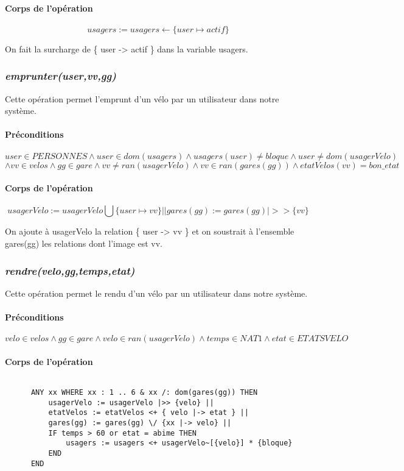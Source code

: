 \documentclass[12pt]{article}
\begin{document}
\paragraph{Corps de l'opération}
\[usagers := usagers \leftarrow \{user \mapsto actif\} \]

On fait la surcharge de \{ user -> actif \} dans la variable usagers.
\subsubsection{\textit{emprunter(user,vv,gg)}}
Cette opération permet l'emprunt d'un vélo par un utilisateur dans notre système.
\paragraph{Préconditions}
\[ user \in PERSONNES \land user \in dom(usagers) \land usagers(user) \neq bloque \land user \neq dom(usagerVelo) \]\[\land vv \in velos \land gg \in gare \land vv \neq ran(usagerVelo) \land vv \in ran(gares(gg)) \land etatVelos(vv) = bon\_etat\]
\paragraph{Corps de l'opération}
	\[ usagerVelo := usagerVelo \bigcup \{user \mapsto vv\} ||
gares(gg) := gares(gg) |>> \{vv\}\]

On ajoute à usagerVelo la relation \{ user -> vv \} et on soustrait à l'ensemble gares(gg) les relations dont l'image est vv.
\subsubsection{\textit{rendre(velo,gg,temps,etat)}}
Cette opération permet le rendu d'un vélo par un utilisateur dans notre système.
\paragraph{Préconditions}
\[ velo \in velos \land gg \in gare \land velo \in ran(usagerVelo) \land temps \in NAT1 \land etat \in ETATSVELO\]

\paragraph{Corps de l'opération}
\[\]
\begin{lstlisting}
      ANY xx WHERE xx : 1 .. 6 & xx /: dom(gares(gg)) THEN
          usagerVelo := usagerVelo |>> {velo} ||
          etatVelos := etatVelos <+ { velo |-> etat } ||
          gares(gg) := gares(gg) \/ {xx |-> velo} ||
          IF temps > 60 or etat = abime THEN
              usagers := usagers <+ usagerVelo~[{velo}] * {bloque}
          END
      END
\end{lstlisting}
\end{document}
